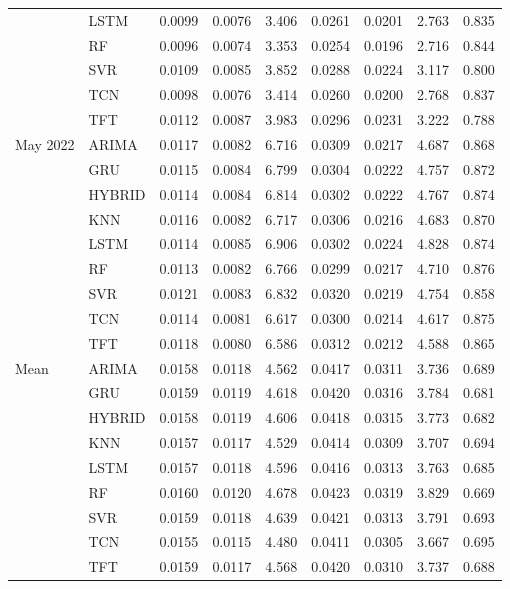 \begin{tabular}{lllllllll}
 & LSTM & 0.0099 & 0.0076 & 3.406 & 0.0261 & 0.0201 & 2.763 & 0.835 \\
 & RF & 0.0096 & 0.0074 & 3.353 & 0.0254 & 0.0196 & 2.716 & 0.844 \\
 & SVR & 0.0109 & 0.0085 & 3.852 & 0.0288 & 0.0224 & 3.117 & 0.800 \\
 & TCN & 0.0098 & 0.0076 & 3.414 & 0.0260 & 0.0200 & 2.768 & 0.837 \\
 & TFT & 0.0112 & 0.0087 & 3.983 & 0.0296 & 0.0231 & 3.222 & 0.788 \\
May 2022 & ARIMA & 0.0117 & 0.0082 & 6.716 & 0.0309 & 0.0217 & 4.687 & 0.868 \\
 & GRU & 0.0115 & 0.0084 & 6.799 & 0.0304 & 0.0222 & 4.757 & 0.872 \\
 & HYBRID & 0.0114 & 0.0084 & 6.814 & 0.0302 & 0.0222 & 4.767 & 0.874 \\
 & KNN & 0.0116 & 0.0082 & 6.717 & 0.0306 & 0.0216 & 4.683 & 0.870 \\
 & LSTM & 0.0114 & 0.0085 & 6.906 & 0.0302 & 0.0224 & 4.828 & 0.874 \\
 & RF & 0.0113 & 0.0082 & 6.766 & 0.0299 & 0.0217 & 4.710 & 0.876 \\
 & SVR & 0.0121 & 0.0083 & 6.832 & 0.0320 & 0.0219 & 4.754 & 0.858 \\
 & TCN & 0.0114 & 0.0081 & 6.617 & 0.0300 & 0.0214 & 4.617 & 0.875 \\
 & TFT & 0.0118 & 0.0080 & 6.586 & 0.0312 & 0.0212 & 4.588 & 0.865 \\
Mean & ARIMA & 0.0158 & 0.0118 & 4.562 & 0.0417 & 0.0311 & 3.736 & 0.689 \\
 & GRU & 0.0159 & 0.0119 & 4.618 & 0.0420 & 0.0316 & 3.784 & 0.681 \\
 & HYBRID & 0.0158 & 0.0119 & 4.606 & 0.0418 & 0.0315 & 3.773 & 0.682 \\
 & KNN & 0.0157 & 0.0117 & 4.529 & 0.0414 & 0.0309 & 3.707 & 0.694 \\
 & LSTM & 0.0157 & 0.0118 & 4.596 & 0.0416 & 0.0313 & 3.763 & 0.685 \\
 & RF & 0.0160 & 0.0120 & 4.678 & 0.0423 & 0.0319 & 3.829 & 0.669 \\
 & SVR & 0.0159 & 0.0118 & 4.639 & 0.0421 & 0.0313 & 3.791 & 0.693 \\
 & TCN & 0.0155 & 0.0115 & 4.480 & 0.0411 & 0.0305 & 3.667 & 0.695 \\
 & TFT & 0.0159 & 0.0117 & 4.568 & 0.0420 & 0.0310 & 3.737 & 0.688 \\
\bottomrule
\end{tabular}
